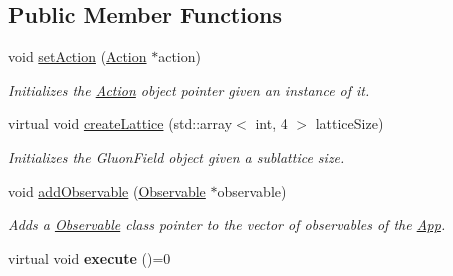 \subsection*{Public Member Functions}
\begin{DoxyCompactItemize}
\item 
void \hyperlink{classApp_a521478e111127d2166d2e897b9900eb5}{set\+Action} (\hyperlink{classAction}{Action} $\ast$action)
\begin{DoxyCompactList}\small\item\em Initializes the \hyperlink{classAction}{Action} object pointer given an instance of it. \end{DoxyCompactList}\item 
virtual void \hyperlink{classApp_a8f35d6814a0306dd31c7c583f6c8d92c}{create\+Lattice} (std\+::array$<$ int, 4 $>$ lattice\+Size)
\begin{DoxyCompactList}\small\item\em Initializes the Gluon\+Field object given a sublattice size. \end{DoxyCompactList}\item 
void \hyperlink{classApp_a4796925a8a54cfe4456419b94160746e}{add\+Observable} (\hyperlink{classObservable}{Observable} $\ast$observable)
\begin{DoxyCompactList}\small\item\em Adds a \hyperlink{classObservable}{Observable} class pointer to the vector of observables of the \hyperlink{classApp}{App}. \end{DoxyCompactList}\item 
virtual void {\bfseries execute} ()=0\hypertarget{classApp_a060dd95f437842171d448ac822dfa983}{}\label{classApp_a060dd95f437842171d448ac822dfa983}

\end{DoxyCompactItemize}
